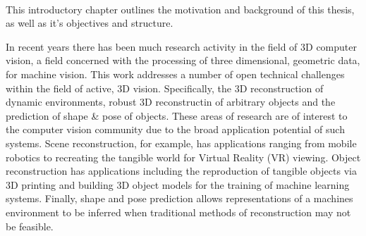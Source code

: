 ~\label{chap:intro}
\begin{chapabs}
This introductory chapter outlines the motivation and background of this thesis, as well as it's objectives 
and structure.
\end{chapabs}

In recent years there has been much research activity in the field of 3D computer vision, a field concerned 
with the processing of three dimensional, geometric data, for machine vision. This work addresses a number of 
open technical challenges within the field of active, 3D vision. Specifically, the 3D reconstruction of 
dynamic environments, robust 3D reconstructin of arbitrary objects and the prediction of shape \& pose of 
objects. These areas of research are of interest to the computer vision community due to the broad application 
potential of such systems. Scene reconstruction, for example, has applications ranging from mobile robotics to 
recreating the tangible world for Virtual Reality (VR) viewing. Object reconstruction has applications including 
the reproduction of tangible objects via 3D printing and building 3D object models for the training of machine 
learning systems. Finally, shape and pose prediction allows representations of a machines environment to be 
inferred when traditional methods of reconstruction may not be feasible.

